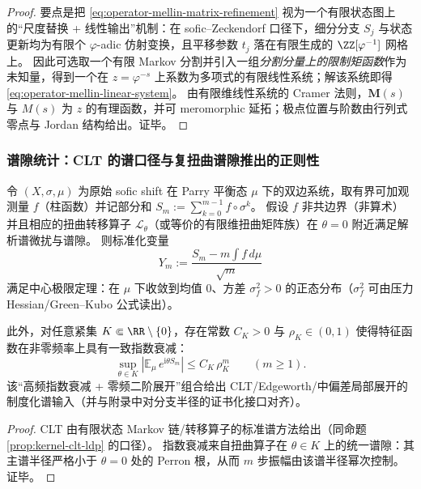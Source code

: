 \begin{proof}
要点是把 \eqref{eq:operator-mellin-matrix-refinement} 视为一个有限状态图上的“尺度替换 + 线性输出”机制：在 sofic--Zeckendorf 口径下，细分分支 \(S_j\) 与状态更新均为有限个 \(\varphi\)-adic 仿射变换，且平移参数 \(t_j\) 落在有限生成的 \(\ZZ[\varphi^{-1}]\) 网格上。
因此可选取一个有限 Markov 分割并引入一组\emph{分割分量上的限制矩函数}作为未知量，得到一个在 \(z=\varphi^{-s}\) 上系数为多项式的有限线性系统；解该系统即得 \eqref{eq:operator-mellin-linear-system}。
由有限维线性系统的 Cramer 法则，\(\mathbf{M}(s)\) 与 \(M(s)\) 为 \(z\) 的有理函数，并可 meromorphic 延拓；极点位置与阶数由行列式零点与 Jordan 结构给出。证毕。
\end{proof}

\subsubsection{谱隙统计：CLT 的谱口径与复扭曲谱隙推出的正则性}

\begin{theorem}\label{thm:conclusion63-clt-spectral}
令 \((X,\sigma,\mu)\) 为原始 sofic shift 在 Parry 平衡态 \(\mu\) 下的双边系统，取有界可加观测量 \(f\)（柱函数）并记部分和
\(
S_m:=\sum_{k=0}^{m-1}f\circ\sigma^{k}
\)。
假设 \(f\) 非共边界（非算术）并且相应的扭曲转移算子 \(\mathcal{L}_{\theta}\)（或等价的有限维扭曲矩阵族）在 \(\theta=0\) 附近满足解析谱微扰与谱隙。
则标准化变量
\[
Y_m:=\frac{S_m-m\int f\,d\mu}{\sqrt{m}}
\]
满足中心极限定理：在 \(\mu\) 下收敛到均值 \(0\)、方差 \(\sigma_f^2>0\) 的正态分布（\(\sigma_f^2\) 可由压力 Hessian/Green--Kubo 公式读出）。
\par
此外，对任意紧集 \(K\Subset \RR\setminus\{0\}\)，存在常数 \(C_K>0\) 与 \(\rho_K\in(0,1)\) 使得特征函数在非零频率上具有一致指数衰减：
\[
\boxed{\;
\sup_{\theta\in K}\left|\mathbb{E}_{\mu}\,e^{\mathrm{i}\theta S_m}\right|
\le C_K\,\rho_K^{m}\qquad(m\ge 1).\;}
\]
该“高频指数衰减 + 零频二阶展开”组合给出 CLT/Edgeworth/中偏差局部展开的制度化谱输入（并与附录中对分支半径的证书化接口对齐）。
\end{theorem}

\begin{proof}
CLT 由有限状态 Markov 链/转移算子的标准谱方法给出（同命题 \ref{prop:kernel-clt-ldp} 的口径）。
指数衰减来自扭曲算子在 \(\theta\in K\) 上的统一谱隙：其主谱半径严格小于 \(\theta=0\) 处的 Perron 根，从而 \(m\) 步振幅由该谱半径幂次控制。证毕。
\end{proof}

